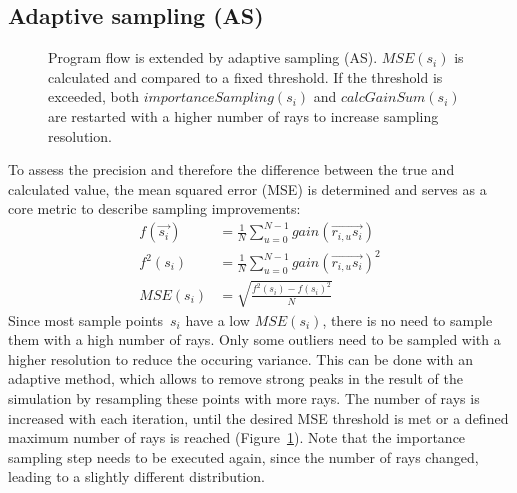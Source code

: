 \subsection{Adaptive sampling (AS)}
\label{subsec:adaptive_sampling}
\begin{figure}[H]
  \centerline
      {}
  \caption{Program flow is extended by adaptive sampling
    (AS). $MSE(s_i)$ is calculated and compared to a fixed
    threshold. If the threshold is exceeded, both
    $importanceSampling(s_i)$ and $calcGainSum(s_i)$ are restarted
    with a higher number of rays to increase sampling resolution.}
  \label{graphic:pap3}
\end{figure}
To assess the precision
and therefore the difference between the true and calculated value,
the mean squared error (MSE) is determined and serves as a core metric to
describe sampling improvements:
\begin{align}
     f(\vec{s_i}) &= \frac{1}{N} \sum_{u=0}^{N-1} gain(\overrightarrow{r_{i,u}s_i})\\
     f^2(s_i)     &= \frac{1}{N} \sum_{u=0}^{N-1} gain(\overrightarrow{r_{i,u}s_i})^2\\
     MSE(s_i)     &= \sqrt{\frac{f^2(s_i) - f(s_i)^2}{N}}
\end{align}
Since most sample points~$s_i$ have a low $MSE(s_i)$, there is no need
to sample them with a high number of rays. Only some outliers need to
be sampled with a higher resolution to reduce the occuring
variance. This can be done with an adaptive method, which allows to
remove strong peaks in the result of the simulation by resampling
these points with more rays. The number of rays is increased with each
iteration, until the desired MSE threshold is met or a defined maximum
number of rays is reached (Figure~\ref{graphic:pap3}).  Note that the
importance sampling step needs to be executed again, since the number
of rays changed, leading to a slightly different distribution.

